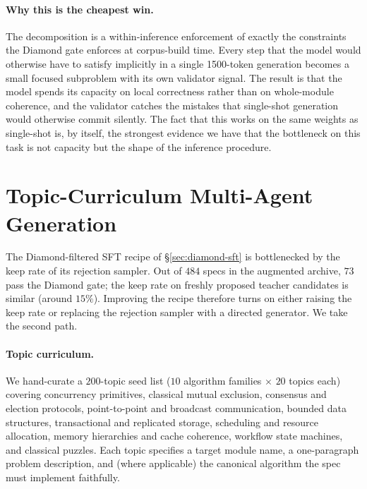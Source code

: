 \documentclass[11pt]{article}
\begin{document}
\paragraph{Why this is the cheapest win.} The decomposition is a
within-inference enforcement of exactly the constraints the Diamond
gate enforces at corpus-build time. Every step that the model would
otherwise have to satisfy implicitly in a single 1500-token generation
becomes a small focused subproblem with its own validator signal. The
result is that the model spends its capacity on local correctness
rather than on whole-module coherence, and the validator catches the
mistakes that single-shot generation would otherwise commit
silently. The fact that this works on the same weights as single-shot
is, by itself, the strongest evidence we have that the bottleneck on
this task is not capacity but the shape of the inference procedure.

\section{Topic-Curriculum Multi-Agent Generation}
\label{sec:gen}

The Diamond-filtered SFT recipe of \S\ref{sec:diamond-sft} is bottlenecked
by the keep rate of its rejection sampler. Out of $484$ specs in the
augmented archive, $73$ pass the Diamond gate; the keep rate on freshly
proposed teacher candidates is similar (around $15\%$). Improving the
recipe therefore turns on either raising the keep rate or replacing the
rejection sampler with a directed generator. We take the second path.

\paragraph{Topic curriculum.} We hand-curate a $200$-topic seed list
($10$ algorithm families $\times$ $20$ topics each) covering
concurrency primitives, classical mutual exclusion, consensus and
election protocols, point-to-point and broadcast communication, bounded
data structures, transactional and replicated storage, scheduling and
resource allocation, memory hierarchies and cache coherence, workflow
state machines, and classical puzzles. Each topic specifies a target
module name, a one-paragraph problem description, and (where
applicable) the canonical algorithm the spec must implement faithfully.
\end{document}
